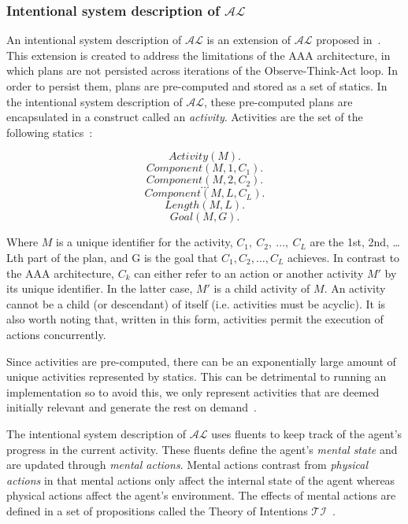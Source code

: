 \subsubsection{Intentional system description of $\mathcal{AL}$}
\label{subsubsec:intentional_action_language_al}

An intentional system description of $ \mathcal{AL} $ is an extension of $ \mathcal{AL} $ proposed in~\cite{blount_architecture_2013}.
This extension is created to address the limitations of the AAA architecture, in which plans are not persisted across iterations of the Observe-Think-Act loop.
In order to persist them, plans are pre-computed and stored as a set of statics.
In the intentional system description of $\mathcal{AL}$, these pre-computed plans are encapsulated in a construct called an \textit{activity}.
Activities are the set of the following statics~\cite{blount_architecture_2013, blount_towards_2014}:

$$
Activity(M).
$$
$$
Component(M, 1, C_1).
$$
$$
Component(M, 2, C_2).
$$
$$
\dots
$$
$$
Component(M, L, C_L).
$$
$$
Length(M, L).
$$
$$
Goal(M, G).
$$

Where $M$ is a unique identifier for the activity, $C_1,\ C_2,\ ...,\ C_L$ are the 1st, 2nd, … Lth part of the plan, and G is the goal that $C_1,C_2,\ldots,C_L$ achieves.
In contrast to the AAA architecture, $C_k$ can either refer to an action or another activity $M'$ by its unique identifier.
In the latter case, $M'$ is a child activity of $M$.
An activity cannot be a child (or descendant) of itself (i.e. activities must be acyclic).
It is also worth noting that, written in this form, activities permit the execution of actions concurrently.

Since activities are pre-computed, there can be an exponentially large amount of unique activities represented by statics.
This can be detrimental to running an implementation so to avoid this, we only represent activities that are deemed initially relevant and generate the rest on demand~\cite{blount_architecture_2013}.

The intentional system description of $\mathcal{AL}$ uses fluents to keep track of the agent's progress in the current activity.
These fluents define the agent's \textit{mental state} and are updated through \textit{mental actions}.
Mental actions contrast from \textit{physical actions} in that mental actions only affect the internal state of the agent whereas physical actions affect the agent's environment.
The effects of mental actions are defined in a set of propositions called the Theory of Intentions $\mathcal{TI}$~\cite{blount_towards_2014}.

